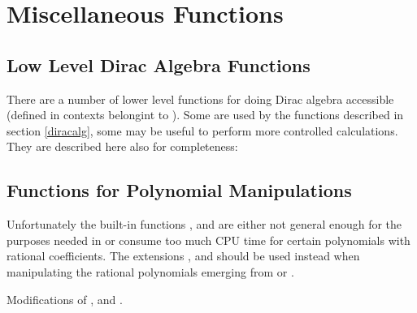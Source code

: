 \section{Miscellaneous Functions}
\label{misc}

\subsection{Low Level Dirac Algebra Functions}
\label{diracLow}

There are a number of lower level functions for doing Dirac algebra accessible
(defined in contexts belongint to ). Some are used by the functions described in
section \ref{diracalg}, some may be useful to perform more controlled
calculations. They are described here also for completeness:

\subsection{Functions for Polynomial Manipulations}

Unfortunately the built-in  functions , 
and  are either not general enough for the purposes needed in 
\fc or consume too much CPU time for certain polynomials
with rational coefficients. The \fc extensions ,  
and  should be used instead when manipulating the rational 
polynomials emerging from  or . 

 {Modifications of ,  and .}

